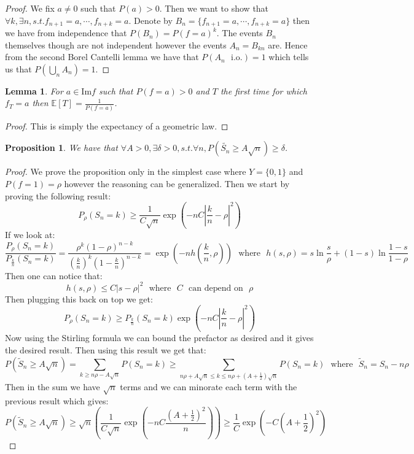 \documentclass[10pt,a4paper]{book}
\newtheorem{lemma}[theorem]{Lemma}
\newtheorem{proposition}{Proposition}[section]
\theoremstyle{definition}
\begin{document}
\begin{proof}
We fix $a \neq 0$ such that $P(a) > 0$. Then we want to show that $\forall k, \exists n, s.t. f_{n+1} = a, \cdots, f_{n+k} = a$. Denote by $B_n = \{f_{n+1} = a, \cdots, f_{n + k} = a\}$ then we have from independence that $P(B_n) = P(f = a)^k$. The events $B_n$ themselves though are not independent however the events $A_{n} = B_{kn}$ are. Hence from the second Borel Cantelli lemma we have that $P(A_n \mbox{~~i.o.}) = 1$ which tells us that $P(\bigcup_n A_n) = 1$.  
\end{proof}

\begin{lemma}
For $a \in \text{Im} f$ such that $P(f = a) > 0$ and $T$ the first time for which $f_T = a$ then $\mathbb{E}[T] = \frac{1}{P(f = a)}$.  
\end{lemma}

\begin{proof}
This is simply the expectancy of a geometric law.
\end{proof}

\begin{proposition}
We have that $\forall A >0, \exists \delta > 0, s.t. \forall n, P(\tilde{S_n} \geq A \sqrt{n}) \geq \delta$.
\end{proposition}

\begin{proof}

We prove the proposition only in the simplest case where $Y = \{0, 1\}$ and $P(f = 1) = \rho$ however the reasoning can be generalized. Then we start by proving the following result:
\[
P_\rho(S_n = k) \geq \frac{1}{C \sqrt{n}} \exp(- n C |\frac{k}{n}  - \rho|^2)
\]
If we look at:
\[
\frac{P_\rho (S_n = k)}{P_{\frac{k}{n}}(S_n = k)} = \frac{\rho^k (1 - \rho)^{n-k}}{(\frac{k}{n})^k (1 - \frac{k}{n})^{n-k}} = \exp(- n h(\frac{k}{n}, \rho)) \mbox{~~where~~} h(s, \rho) = s\ln\frac{s}{\rho} + (1 - s) \ln \frac{1 - s}{1 - \rho}
\]
Then one can notice that:
\[
h(s, \rho) \leq C |s - \rho|^2 \mbox{~~where~~} C \mbox{~~can depend on~~} \rho
\]
Then plugging this back on top we get:
\[
P_\rho (S_n = k) \geq P_{\frac{k}{n}} (S_n = k) \exp(-nC | \frac{k}{n} - \rho|^2 )
\]
Now using the Stirling formula we can bound the prefactor as desired and it gives the desired result. Then using this result we get that:
\[
P(\tilde{S}_n \geq A \sqrt{n}) = \sum_{k \geq n \rho - A \sqrt{n}} P(S_n = k) \geq \sum_{n\rho + A \sqrt{n} \leq k \leq n\rho + (A +\frac{1}{2})\sqrt{n}} P(S_n = k) \mbox{~~where~~} \tilde{S}_n = S_n - n\rho
\]
Then in the sum we have $\sqrt{n}$ terms and we can minorate each term with the previous result which gives:
\[
P(\tilde{S}_n \geq A \sqrt{n}) \geq \sqrt{n} \left(\frac{1}{C \sqrt{n}} \exp( - n C \frac{(A + \frac{1}{2})^2}{n} ) \right) \geq \frac{1}{C} \exp(- C(A + \frac{1}{2})^2)
\]

\end{proof}
\end{document}
